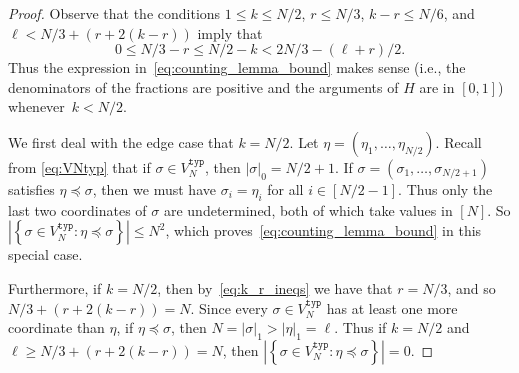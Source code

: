 \documentclass[11pt]{article}
\numberwithin{equation}{section}
\theoremstyle{definition}
\begin{document}
\begin{proof} 
Observe that the conditions
$1 \leq k \leq N/2$, 
$r \leq N/3$, 
$k-r \leq N/6$, 
and 
$\ell < N/3 + (r + 2(k-r))$ 
imply that 
\begin{equation}\label{eq:k_r_ineqs}
0 \leq N/3 - r 
\leq N/2 - k 
< 2N/3 - (\ell+r)/2.
\end{equation}
Thus the expression in~\eqref{eq:counting_lemma_bound} makes sense (i.e., the denominators of the fractions are positive and the arguments of $H$ are in $[0,1]$) whenever~$k < N/2$. 

We first deal with the edge case that $k = N/2$. Let $\eta = ( \eta_{1}, \ldots, \eta_{N/2} )$. 
Recall from \eqref{eq:VNtyp} that if $\sigma \in V_{N}^{\mathtt{typ}}$, 
then $|\sigma|_{0} = N/2 + 1$. 
If $\sigma = (\sigma_{1}, \ldots, \sigma_{N/2+1})$ satisfies $\eta \preccurlyeq \sigma$, 
then we must have $\sigma_{i} = \eta_{i}$ for all $i \in [N/2-1]$. 
Thus only the last two coordinates of $\sigma$ are undetermined, both of which take values in $[N]$. 
So
$\left| \left\{ \sigma \in V_{N}^{\mathtt{typ}} : \eta \preccurlyeq \sigma \right\} \right| 
\leq N^{2}$, which proves~\eqref{eq:counting_lemma_bound} in this special case. 

Furthermore, if $k = N/2$, then by~\eqref{eq:k_r_ineqs} 
we have that $r = N/3$, 
and so 
$N/3 + (r+2(k-r)) = N$. Since every $\sigma \in V_{N}^{\mathtt{typ}}$ has at least one more coordinate than $\eta$, if $\eta \preccurlyeq \sigma$, then $N = |\sigma|_{1} > |\eta|_{1} = \ell$. 
Thus if $k= N/2$ and $\ell \geq N/3 + (r+2(k-r)) = N$, then 
$\left| \left\{ \sigma \in V_{N}^{\mathtt{typ}} : \eta \preccurlyeq \sigma \right\} \right| = 0$. 


\end{proof}
\end{document}
